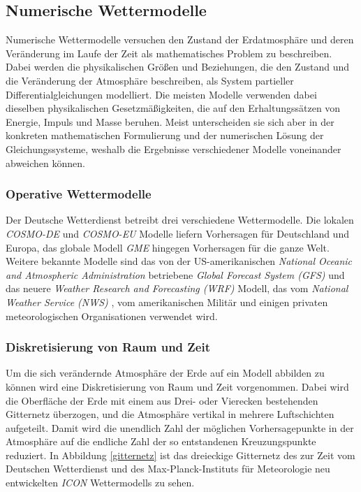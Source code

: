 \subsection{Numerische Wettermodelle}

Numerische Wettermodelle versuchen den Zustand der Erdatmosphäre und
deren Veränderung im Laufe der Zeit als mathematisches Problem zu
beschreiben. Dabei werden die physikalischen Größen und Beziehungen,
die den Zustand und die Veränderung der Atmosphäre beschreiben, als
System partieller Differentialgleichungen modelliert. Die meisten
Modelle verwenden dabei dieselben physikalischen Gesetzmäßigkeiten,
die auf den Erhaltungssätzen von Energie, Impuls und Masse
beruhen. Meist unterscheiden sie sich aber in der konkreten
mathematischen Formulierung und der numerischen Lösung der
Gleichungssysteme, weshalb die Ergebnisse verschiedener Modelle
voneinander abweichen können.

\subsubsection{Operative Wettermodelle}

Der Deutsche Wetterdienst betreibt drei verschiedene
Wettermodelle. Die lokalen \textit{COSMO-DE} und \textit{COSMO-EU}
Modelle liefern Vorhersagen für Deutschland und Europa, das globale
Modell \textit{GME} hingegen Vorhersagen für die ganze Welt. Weitere
bekannte Modelle sind das von der US-amerikanischen \textit{National
  Oceanic and Atmospheric Administration} betriebene \textit{Global
  Forecast System (GFS)} 
und das neuere \textit{Weather Research and Forecasting (WRF)}
 Modell, das vom
\textit{National Weather Service (NWS)} , vom amerikanischen Militär und einigen privaten
meteorologischen Organisationen verwendet wird.

\subsubsection{Diskretisierung von Raum und Zeit}

Um die sich verändernde Atmosphäre der Erde auf ein Modell abbilden zu
können wird eine Diskretisierung von Raum und Zeit vorgenommen. Dabei
wird die Oberfläche der Erde mit einem aus Drei- oder Vierecken
bestehenden Gitternetz überzogen, und die Atmosphäre vertikal in
mehrere Luftschichten aufgeteilt. Damit wird die unendlich Zahl der
möglichen Vorhersagepunkte in der Atmosphäre auf die endliche Zahl der
so entstandenen Kreuzungspunkte reduziert. In Abbildung
\ref{gitternetz} ist das dreieckige Gitternetz des zur Zeit vom
Deutschen Wetterdienst und des Max-Planck-Instituts für Meteorologie
neu entwickelten \textit{ICON}  Wettermodells zu sehen.

